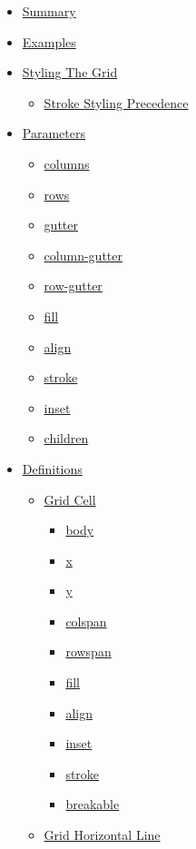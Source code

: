 \begin{itemize}
\tightlist
\item
  \hyperref[summary]{Summary}
\item
  \hyperref[examples]{Examples}
\item
  \hyperref[styling-the-grid]{Styling The Grid}

  \begin{itemize}
  \tightlist
  \item
    \hyperref[stroke-styling-precedence]{Stroke Styling Precedence}
  \end{itemize}
\item
  \hyperref[parameters]{Parameters}

  \begin{itemize}
  \tightlist
  \item
    \hyperref[parameters-columns]{columns}
  \item
    \hyperref[parameters-rows]{rows}
  \item
    \hyperref[parameters-gutter]{gutter}
  \item
    \hyperref[parameters-column-gutter]{column-gutter}
  \item
    \hyperref[parameters-row-gutter]{row-gutter}
  \item
    \hyperref[parameters-fill]{fill}
  \item
    \hyperref[parameters-align]{align}
  \item
    \hyperref[parameters-stroke]{stroke}
  \item
    \hyperref[parameters-inset]{inset}
  \item
    \hyperref[parameters-children]{children}
  \end{itemize}
\item
  \hyperref[definitions]{Definitions}

  \begin{itemize}
  \tightlist
  \item
    \hyperref[definitions-cell]{Grid Cell}

    \begin{itemize}
    \tightlist
    \item
      \hyperref[definitions-cell-body]{body}
    \item
      \hyperref[definitions-cell-x]{x}
    \item
      \hyperref[definitions-cell-y]{y}
    \item
      \hyperref[definitions-cell-colspan]{colspan}
    \item
      \hyperref[definitions-cell-rowspan]{rowspan}
    \item
      \hyperref[definitions-cell-fill]{fill}
    \item
      \hyperref[definitions-cell-align]{align}
    \item
      \hyperref[definitions-cell-inset]{inset}
    \item
      \hyperref[definitions-cell-stroke]{stroke}
    \item
      \hyperref[definitions-cell-breakable]{breakable}
    \end{itemize}
  \item
    \hyperref[definitions-hline]{Grid Horizontal Line}


\end{itemize}
\end{itemize}
